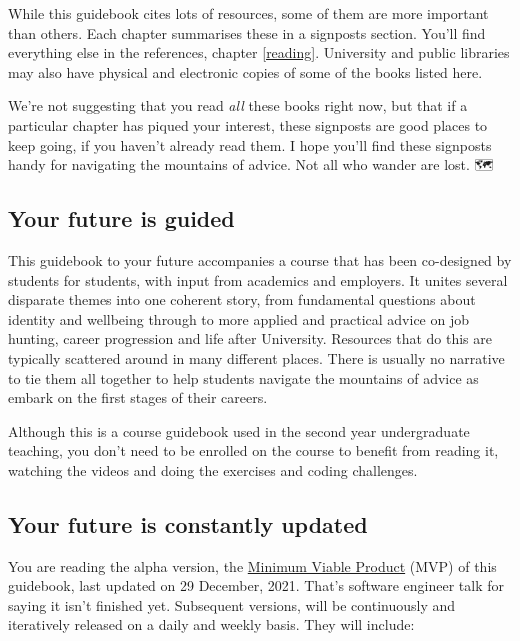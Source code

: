 \documentclass[
]{book}
\begin{document}
While this guidebook cites lots of resources, some of them are more important than others. Each chapter summarises these in a signposts section. You'll find everything else in the references, chapter \ref{reading}. University and public libraries may also have physical and electronic copies of some of the books listed here.

We're not suggesting that you read \emph{all} these books right now, but that if a particular chapter has piqued your interest, these signposts are good places to keep going, if you haven't already read them. I hope you'll find these signposts handy for navigating the mountains of advice. Not all who wander are lost. 🗺️🧭

\hypertarget{study}{%
\subsection{Your future is guided}\label{study}}

This guidebook to your future accompanies a course that has been co-designed by students for students, with input from academics and employers. It unites several disparate themes into one coherent story, from fundamental questions about identity and wellbeing through to more applied and practical advice on job hunting, career progression and life after University. Resources that do this are typically scattered around in many different places. There is usually no narrative to tie them all together to help students navigate the mountains of advice as embark on the first stages of their careers.

Although this is a course guidebook used in the second year undergraduate teaching, you don't need to be enrolled on the course to benefit from reading it, watching the videos and doing the exercises and coding challenges.

\hypertarget{version}{%
\subsection{Your future is constantly updated}\label{version}}

You are reading the alpha version, the \href{https://en.wikipedia.org/wiki/Minimum_viable_product}{Minimum Viable Product} (MVP) of this guidebook, last updated on 29 December, 2021. That's software engineer talk for saying it isn't finished yet. Subsequent versions, will be continuously and iteratively released on a daily and weekly basis. They will include:
\end{document}
